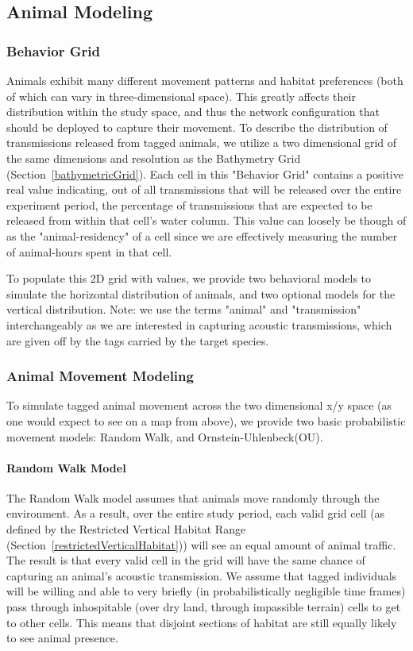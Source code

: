\subsection{Animal Modeling}
\label{animalModeling}

\subsubsection{Behavior Grid}
\label{behaviorGrid}
Animals exhibit many different movement patterns and habitat preferences (both of which can vary in three-dimensional space).  This greatly affects their distribution within the study space, and thus the network configuration that should be deployed to capture their movement.  To describe the distribution of transmissions released from tagged animals, we utilize a two dimensional grid of the same dimensions and resolution as the Bathymetry Grid (Section~\ref{bathymetricGrid}).  Each cell in this "Behavior Grid" contains a positive real value indicating, out of all transmissions that will be released over the entire experiment period, the percentage of transmissions that are expected to be released from within that cell's water column.  This value can loosely be though of as the "animal-residency" of a cell since we are effectively measuring the number of animal-hours spent in that cell.  

To populate this 2D grid with values, we provide two behavioral models to simulate the horizontal distribution of animals, and two optional models for the vertical distribution.  Note: we use the terms "animal" and "transmission" interchangeably as we are interested in capturing acoustic transmissions, which are given off by the tags carried by the target species.  


\subsubsection{Animal Movement Modeling}
\label{animalMovementModel}
To simulate tagged animal movement across the two dimensional x/y space (as one would expect to see on a map from above), we provide two basic probabilistic movement models: Random Walk, and Ornstein-Uhlenbeck(OU).  

\paragraph{Random Walk Model}
\label{randomWalkModel}
The Random Walk model assumes that animals move randomly through the environment.  As a result, over the entire study period, each valid grid cell (as defined by the Restricted Vertical Habitat Range (Section~\ref{restrictedVerticalHabitat})) will see an equal amount of animal traffic.  The result is that every valid cell  in the grid will have the same chance of capturing an animal's acoustic transmission.  We assume that tagged individuals will be willing and able to very briefly (in probabilistically negligible time frames) pass through inhospitable (over dry land, through impassible terrain) cells to get to other cells.  This means that disjoint sections of habitat are still equally likely to see animal presence.

